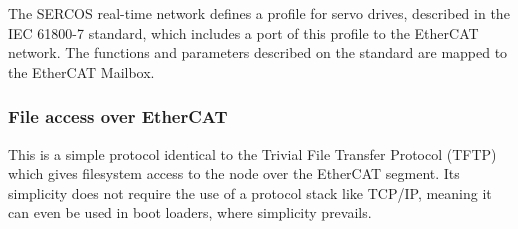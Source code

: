 The SERCOS\texttrademark{} real-time network defines a profile for servo drives, described in the IEC 61800-7 standard, which includes a port of this profile to the EtherCAT network. The functions and parameters described on the standard are mapped to the EtherCAT Mailbox.

\subsubsection*{File access over EtherCAT}

This is a simple protocol identical to the Trivial File Transfer Protocol (TFTP) which gives filesystem access to the node over the EtherCAT segment.
Its simplicity does not require the use of a protocol stack like TCP/IP, meaning it can even be used in boot loaders, where simplicity prevails.
